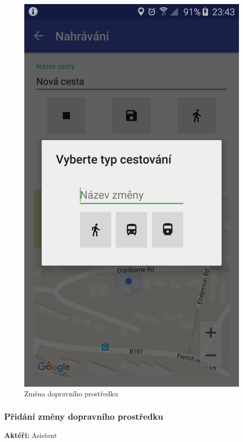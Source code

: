 \documentclass{article}
\newcommand{\usecase}[2]{\subsubsection{#1}\label{#2}}
\begin{document}
\begin{figure}[H]
\begin{minipage}{.5\textwidth}
                  \includegraphics[scale=0.14]{img/screen/zmenaprostredku.png}
          \caption{Změna dopravního prostředku}
          \label{fig:pridanizmenyprostredku}

       \end{minipage}
\end{figure}

\usecase{Přidání změny dopravního prostředku}{pridanizmenyprostredku}
\textbf{Aktéři:} Asistent
\end{document}
